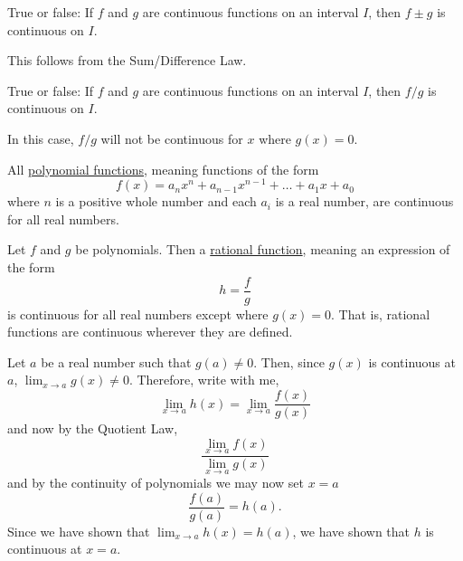 \documentclass{ximera}
\begin{document}
\begin{question}
  True or false: If $f$ and $g$ are continuous functions on an
  interval $I$, then $f\pm g$ is continuous on $I$.
  \begin{multipleChoice}
  \end{multipleChoice}
  \begin{feedback}
    This follows from the Sum/Difference Law.
  \end{feedback}
\end{question}

\begin{question}
  True or false: If $f$ and $g$ are continuous functions on an
  interval $I$, then $f/g$ is continuous on $I$.
  \begin{multipleChoice}
  \end{multipleChoice}
  \begin{feedback}
    In this case, $f/g$ will not be continuous for $x$ where $g(x) =
    0$.
  \end{feedback}
\end{question}


\begin{theorem}
  All \href{https://ximera.osu.edu/math160fa17/m160prerequisites/PreRequisiteXards/U2CommonFunctions/2.1Polynomials/2.1TitlePage/2.1TitlePage}{polynomial functions}, meaning functions of the form
  \[
  f(x) = a_nx^n + a_{n-1}x^{n-1} + \dots + a_1 x + a_0
  \]
  where $n$ is a positive whole number and each $a_i$ is a real number, are
  continuous for all real numbers.
\end{theorem}

\begin{theorem}
  Let $f$ and $g$ be polynomials.  Then a \href{https://ximera.osu.edu/math160fa17/m160prerequisites/PreRequisiteXards/U2CommonFunctions/2.2RationalFunctions/titlePage}{rational function}, meaning an
  expression of the form
  \[
  h=\frac{f}{g}
  \]
  is continuous for all real numbers except where $g(x)=0$.  That is,
  rational functions are continuous wherever they are defined.
\begin{explanation}
      Let $a$ be a real number such that $g(a)\neq 0$.  Then, since
      $g(x)$ is continuous at $a$, $\displaystyle\lim_{x\to a} g(x) \neq 0$.
      Therefore, write with me, 
      \[
      \displaystyle\lim_{x \to a} h(x) = \displaystyle\lim_{x\to a} \frac{f(x)}{g(x)}
      \]
      and now by the Quotient Law, 
      \[
      \frac{\displaystyle\lim_{x\to a} f(x)}{\displaystyle \lim_{x\to a} g(x)}
      \]
      and by the continuity of polynomials we may now set $x=a$
      \[
      \frac{f(a)}{g(a)}=h(a).
      \]
      Since we have shown that $\displaystyle\lim_{x\to a} h(x) = h(a)$, we have
      shown that $h$ is continuous at $x=a$.
\end{explanation}
\end{theorem}
\end{document}
